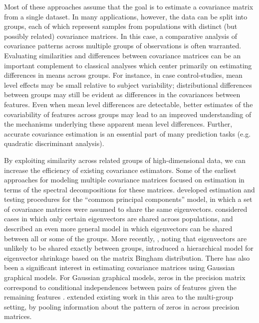 \documentclass{article}
\begin{document}
Most of these approaches assume that the goal is to estimate a
covariance matrix from a single dataset.  In many applications,
however, the data can be split into groups, each of which represent
samples from populations with distinct (but possibly related)
covariance matrices.  In this case, a comparative analysis of
covariance patterns across multiple groups of observations is often
warranted.  Evaluating similarities and differences between covariance
matrices can be an important complement to classical analyses which
center primarily on estimating differences in means across groups.
For instance, in case control-studies, mean level effects may be small
relative to subject variability; distributional differences between
groups may still be evident as differences in the covariances between
features.  Even when mean level differences are detectable, better
estimates of the covariability of features across groups may lead to
an improved understanding of the mechanisms underlying these apparent
mean level differences.  Further, accurate covariance estimation is an
essential part of many prediction tasks (e.g. quadratic discriminant
analysis).

By exploiting similarity across related groups of high-dimensional
data, we can increase the efficiency of existing covariance
estimators.  Some of the earliest approaches for modeling multiple
covariance matrices focused on estimation in terms of the spectral
decompositions for these matrices.  \cite{Flury1987} developed
estimation and testing procedures for the ``common principal
components'' model, in which a set of covariance matrices were assumed
to share the same eigenvectors.  \citet{Schott1991, Schott1999}
considered cases in which only certain eigenvectors are shared across
populations, and \citet{Boik2002} described an even more general model
in which eigenvectors can be shared between all or some of the groups.
More recently, \citet{Hoff2009}, noting that eigenvectors are unlikely
to be shared exactly between groups, introduced a hierarchical model
for eigenvector shrinkage based on the matrix Bingham distribution.
There has also been a significant interest in estimating covariance
matrices using Gaussian graphical models. For Gaussian graphical
models, zeros in the precision matrix correspond to conditional
independences between pairs of features given the remaining features
\citep{Meinshausen2006}.  \citet{Witten2014} extended existing work in
this area to the multi-group setting, by pooling information about the
pattern of zeros in across precision matrices.
\end{document}
